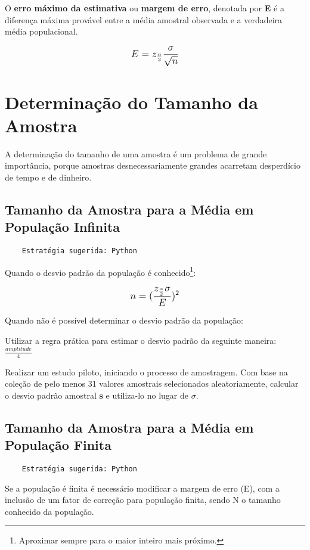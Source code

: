 O \textbf{erro máximo da estimativa} ou \textbf{margem de erro}, denotada por \textbf{E} é a diferença máxima provável entre a média amostral observada e a verdadeira média populacional.

\[\beq{ E = z_\frac{\alpha}{2}\frac{\sigma}{\sqrt{n}} }\]

\section{Determinação do Tamanho da Amostra}

A determinação do tamanho de uma amostra é um problema de grande importância, porque amostras desnecessariamente grandes acarretam desperdício de tempo e de dinheiro.

\subsection{Tamanho da Amostra para a Média em População Infinita}

\begin{verbatim}
	Estratégia sugerida: Python
\end{verbatim}

Quando o desvio padrão da população é conhecido\footnote{Aproximar sempre para o maior inteiro mais próximo.}:

\[\beq{ n = (\frac{z_\frac{\alpha}{2}\sigma}{E})^2 }\]

Quando não é possível determinar o desvio padrão da população:
\begin{alineas}
	\item Utilizar a regra prática para estimar o desvio padrão da seguinte maneira: \( \frac{amplitude}{4} \)
	\item Realizar um estudo piloto, iniciando o processo de amostragem. Com base na coleção de pelo menos 31 valores amostrais selecionados aleatoriamente, calcular o desvio padrão amostral \textbf{s} e utiliza-lo no lugar de \(\sigma\).
\end{alineas}

\subsection{Tamanho da Amostra para a Média em População Finita}

\begin{verbatim}
	Estratégia sugerida: Python
\end{verbatim}

Se a população é finita é necessário modificar a margem de erro (E), com a inclusão de um fator de correção para população finita, sendo N o tamanho conhecido da população.


